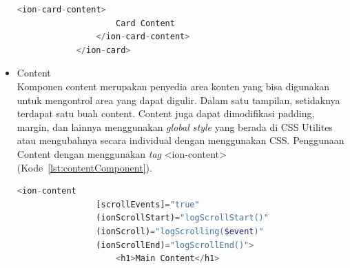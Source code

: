 \begin{itemize}
\begin{lstlisting}[language=php, label={lst:cardComponent}, caption=Potongan Kode Program dari Card Component]
				<ion-card-content>
					Card Content
				</ion-card-content>
			</ion-card>
	\end{lstlisting} 
	\item Content\\
	Komponen content merupakan penyedia area konten yang bisa digunakan untuk mengontrol area yang dapat digulir. Dalam satu tampilan, setidaknya terdapat satu buah content. Content juga dapat dimodifikasi padding, margin, dan lainnya menggunakan {\it global style} yang berada di CSS Utilites atau mengubahnya secara individual dengan menggunakan CSS. Penggunaan Content dengan menggunakan {\it tag} <ion-content> (Kode~\ref{lst:contentComponent}).

\newpage

	\begin{lstlisting}[language=php, label={lst:contentComponent}, caption=Potongan Kode Program dari Content Component]
			<ion-content
				[scrollEvents]="true"
				(ionScrollStart)="logScrollStart()"
				(ionScroll)="logScrolling($event)"
				(ionScrollEnd)="logScrollEnd()">
					<h1>Main Content</h1>
			

\end{lstlisting}
\end{itemize}

